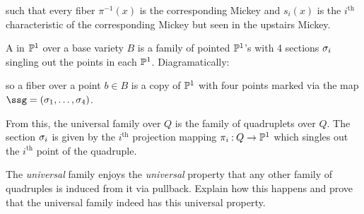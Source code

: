 \documentclass[12pt]{memoir}
\newcommand{\Submickey}{\pre{\scalebox{0.75}{\ensuremath\bullet}}\hspace{-0.9mm}{\raisebox{-0.35mm}{\scalebox{1.1}{\ensuremath\bullet}}}^{\hspace{-1.1mm}\raisebox{-0.1mm}{\scalebox{0.75}{\ensuremath\bullet}}}}
\begin{document}
\begin{figure}[h!]
    \centering
{}
    \label{fig-example-universal-family-diagram}
\end{figure}

such that every fiber $\pi^{-1}(x)$ is the corresponding Mickey and $s_i(x)$ is the $i^{\text{th}}$ characteristic of the corresponding Mickey but seen in the upstairs Mickey.

\begin{Def}
    A  in $\mathbb{P}^1$ over a base variety $B$ is a family of pointed $\mathbb{P}^1$'s with 4 sections $\sigma_i$ singling out the points in each $\mathbb{P}^1$. Diagramatically: 
    \begin{center}
    \end{center}
    so a fiber over a point $b\in B$ is a copy of $\mathbb{P}^1$ with four points marked via the map $\ssg=(\sg_1,\dots,\sg_4)$.
\end{Def}

From this, the universal family over $Q$ is the family of quadruplets over $Q$. The section $\sigma_i$ is given by the $i^{\text{th}}$ projection mapping $\pi_i\mathbin{:} Q\to\mathbb{P}^1$ which singles out the $i^{\text{th}}$ point of the quadruple.

\begin{Ej}
    The \emph{universal} family enjoys the \emph{universal} property that any other family of quadruples is induced from it via pullback. Explain how this happens and prove that the universal family indeed has this universal property.
\end{Ej}
\end{document}
